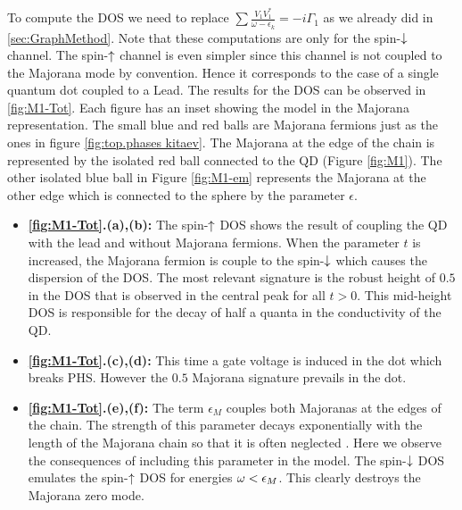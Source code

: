To compute the DOS we need to replace $\sum \frac{V_1V^*_1}{\omega -\epsilon_k}= -i\Gamma_1$ as we already did in \ref{sec:GraphMethod}. Note that these computations are only for the spin-$\downarrow$ channel. The spin-$\uparrow$ channel is even simpler since this channel is not coupled to the Majorana mode by convention. Hence it corresponds to the case of a single quantum dot coupled to a Lead.  The results for the DOS can be observed in \ref{fig:M1-Tot}. Each figure has an inset showing the model in the Majorana representation. The small blue and red balls are Majorana fermions just as the ones in figure \ref{fig:top.phases kitaev}. The Majorana at the edge of the  chain is represented by the isolated red ball connected to the QD (Figure \ref{fig:M1}). The other isolated blue ball in Figure \ref{fig:M1-em} represents the Majorana at the other edge which is connected to the sphere by the parameter $\epsilon$. 

\begin{itemize}
    \item\textbf{ \ref{fig:M1-Tot}.(a),(b):}  The spin-$\uparrow$ DOS shows the result of coupling the QD with the lead and without Majorana fermions. When the parameter $t$ is increased, the Majorana fermion is couple to the spin-$\downarrow$ which causes the dispersion of the DOS. The most relevant signature is the robust height of $0.5$  in the DOS that is observed in the central peak for all $t>0$. This mid-height DOS is responsible for the decay of half a quanta in the conductivity of the QD.
  
    \item\textbf{ \ref{fig:M1-Tot}.(c),(d):} This time a gate voltage is induced in the dot which breaks PHS. However the $0.5$ Majorana signature prevails in the dot. 
    
    \item\textbf{ \ref{fig:M1-Tot}.(e),(f):} The term $\epsilon_M$ couples both Majoranas at the edges of the chain. The strength of this parameter decays exponentially with the length of the Majorana  chain so that it is often neglected . Here we observe the consequences of including this parameter in the model. The spin-$\downarrow$ DOS emulates the spin-$\uparrow$ DOS for energies $\omega < \epsilon_M$. This clearly destroys the Majorana zero mode.   
\end{itemize}








